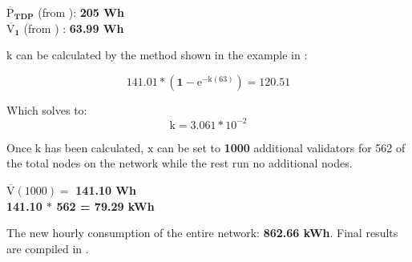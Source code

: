$\boldsymbol{\mathrm{\overline{P}}_{TDP}}$ (from ): \textbf{205 Wh} \\
$\boldsymbol{ \overline{\mathrm{V}}_{1}}$ (from ) : \textbf{63.99 Wh} 

$\boldsymbol{\mathrm{k}}$ can be calculated by the method shown in the example in :

\begin{equation*}
    \boldsymbol{\mathrm{141.01} * (1-\mathrm{e}^{-\mathrm{k}(\mathrm{63})}) = \mathrm{120.51}}
\end{equation*}

Which solves to:
\begin{equation*}
    \boldsymbol{\mathrm{k} = \mathrm{{3.061} * {10}^{-2}}}
\end{equation*}

Once $\boldsymbol{\mathrm{k}}$ has been calculated, $\boldsymbol{\mathrm{x}}$ can be set to \textbf{1000} additional validators for 562 of the total nodes on the network while the rest run no additional nodes.
\begin{center}
    $\boldsymbol{\mathrm{\overline{V}(\mathrm{1000})}} =$ \textbf{141.10 Wh} \\
 \textbf{141.10 $*$ 562 = 79.29 kWh}
\end{center}

The new hourly consumption of the entire network: \textbf{862.66 kWh}. Final results are compiled in .




